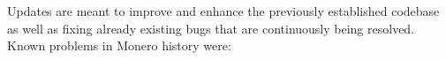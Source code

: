 \documentclass[
  printed, %
  table,   %
  nolof,     %
  nolot,     %
           oneside, color
]{fithesis3}
\begin{document}

Updates are meant to improve and enhance the previously established codebase as well as fixing already existing bugs that are continuously being resolved. Known problems in Monero history were:

\end{document}
